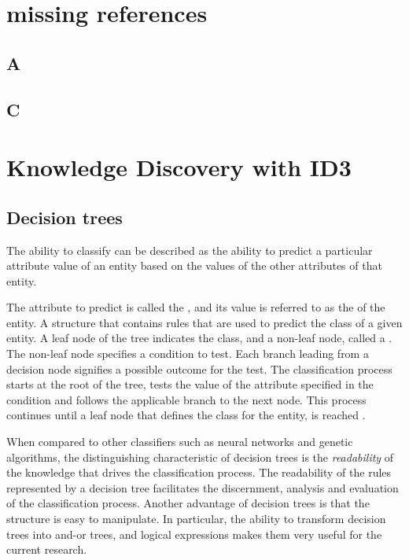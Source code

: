 \chapter{missing references}
\section{A}\label{sec:encoding_examples}

\section{C}\label{tab:attribute_regions}

\chapter{Knowledge Discovery with ID3}

\section{Decision trees}
\label{sec:decision_tree}   
 The ability to classify can be described as the ability to predict a particular attribute value of an entity based on the values of the other attributes of that entity.  

  The attribute to predict is called the , and its value is referred to as the  of the entity. 
 {A structure that contains rules that are used to predict the class of a given entity.  A leaf node of the tree indicates the class, and a non-leaf node, called a . The non-leaf node specifies a condition to test. Each branch leading from a decision node signifies a possible outcome for the test.  The classification process starts at the root of the tree, tests the value of the attribute specified in the condition and follows the applicable branch to the next node. This process continues until a leaf node that defines the class for the entity, is reached \cite{jackson:learning}}.

When compared to other classifiers such as neural networks and genetic algorithms, the distinguishing characteristic of decision trees is the {\sl readability} of the knowledge that drives the classification process.  The readability of the rules represented by a decision tree facilitates the discernment, analysis and evaluation of the classification process.  Another advantage of decision trees is that the structure is easy to manipulate.  In particular, the ability to transform decision trees into and-or trees, and logical expressions makes them very useful for the current research.


